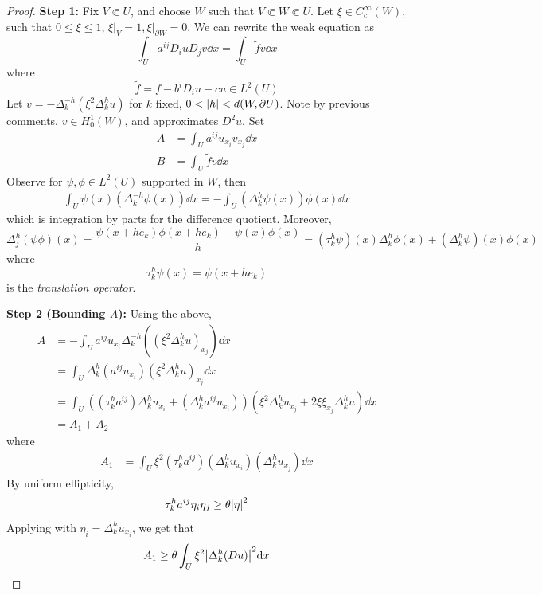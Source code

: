 \documentclass{article}
\begin{document}
\begin{proof}
    \textbf{Step 1:} Fix \(V \Subset U\), and choose \(W\) such that \(V \Subset W \Subset U\). Let \(\xi \in C_c^\infty(W)\), such that \(0 \le \xi \le 1\), \(\xi\vert_V = 1, \xi\vert_{\partial W} = 0\). We can rewrite the weak equation as
    \[\int_U a^{ij}D_i u D_j v \dd x = \int_U \tilde f v \dd x\]
    where
    \[\tilde f = f - b^iD_i u - cu \in L^2(U)\]
    Let \(v = -\Delta_k^{-h}(\xi^2\Delta_k^hu)\) for \(k\) fixed, \(0 < \abs{h} < d(W, \partial U)\). Note by previous comments, \(v \in H^1_0(W)\), and approximates \(D^2u\). Set
    \begin{align*}
        A &= \int_U a^{ij}u_{x_i} v_{x_j} \dd x \\
        B &= \int_U \tilde f v \dd x
    \end{align*}
\lec
    Observe for \(\psi, \phi \in L^2(U)\) supported in \(W\), then
    \begin{align*}
        \int_U \psi(x)\left(\Delta_k^{-h}\phi(x)\right) \dd x = - \int_U (\Delta_k^h\psi(x))\phi(x)\dd x
    \end{align*}
    which is integration by parts for the difference quotient. Moreover,
    \[\Delta_j^h(\psi\phi)(x) = \frac{\psi(x + h e_k)\phi(x + he_k) - \psi(x)\phi(x)}{h} = (\tau_k^h\psi)(x) \Delta_k^h\phi(x) + (\Delta_k^h\psi)(x)\phi(x)\]
    where
    \[\tau_k^h\psi(x) = \psi(x + he_k)\]
    is the \emph{translation operator}.

    \textbf{Step 2 (Bounding \(A\)):} Using the above,
    \begin{align*}
        A &= -\int_U a^{ij}u_{x_i}\Delta_k^{-h}((\xi^2 \Delta_k^h u)_{x_j})\dd x \\
        &= \int_U \Delta_k^h(a^{ij}u_{x_i})(\xi^2 \Delta_k^h u)_{x_j} \dd x \\
        &= \int_U \left((\tau^h_k a^{ij})\Delta^h_k u_{x_i} + (\Delta^h_ka^{ij}u_{x_i})\right)\left(\xi^2 \Delta^h_ku_{x_j} + 2\xi \xi_{x_j}\Delta^h_k u\right)\dd x \\
        &= A_1 + A_2
    \end{align*}
    where
    \begin{align*}
        A_1 &= \int_U \xi^2(\tau_k^h a^{ij})(\Delta_k^h u_{x_i})(\Delta_k^h u_{x_j}) \dd x
    \end{align*}
    By uniform ellipticity,
    \[\tau_k^h a^{ij}\eta_i\eta_j \ge \theta \abs{\eta}^2\]
    Applying with \(\eta_i = \Delta_k^hu_{x_i}\), we get that
    \[A_1 \ge \theta \int_U \xi^2\abs{\Delta_k^h(D u)}^2 \dd x\]


\end{proof}
\end{document}
